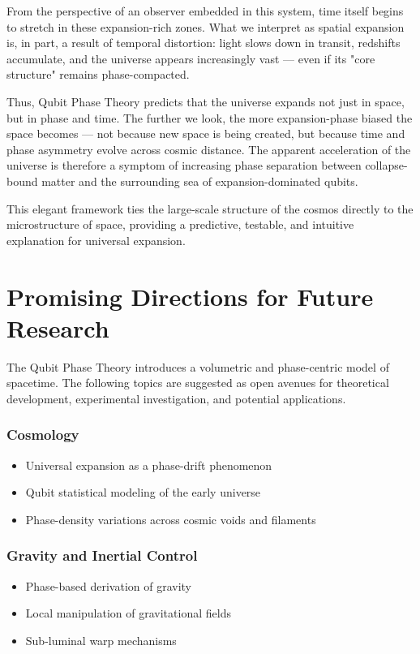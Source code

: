 \documentclass[12pt]{report} %
\begin{document}
From the perspective of an observer embedded in this system, time itself begins to stretch in these expansion-rich zones. What we interpret as spatial expansion is, in part, a result of temporal distortion: light slows down in transit, redshifts accumulate, and the universe appears increasingly vast — even if its "core structure" remains phase-compacted.

Thus, Qubit Phase Theory predicts that the universe expands not just in space, but in phase and time. The further we look, the more expansion-phase biased the space becomes — not because new space is being created, but because time and phase asymmetry evolve across cosmic distance. The apparent acceleration of the universe is therefore a symptom of increasing phase separation between collapse-bound matter and the surrounding sea of expansion-dominated qubits.

This elegant framework ties the large-scale structure of the cosmos directly to the microstructure of space, providing a predictive, testable, and intuitive explanation for universal expansion.

\chapter{Promising Directions for Future Research}

The Qubit Phase Theory introduces a volumetric and phase-centric model of spacetime. The following topics are suggested as open avenues for theoretical development, experimental investigation, and potential applications.

\subsection{Cosmology}
\begin{itemize}
  \item Universal expansion as a phase-drift phenomenon  
  \item Qubit statistical modeling of the early universe  
  \item Phase-density variations across cosmic voids and filaments  
\end{itemize}

\subsection{Gravity and Inertial Control}
\begin{itemize}
  \item Phase-based derivation of gravity  
  \item Local manipulation of gravitational fields  
  \item Sub-luminal warp mechanisms  
\end{itemize}
\end{document}
